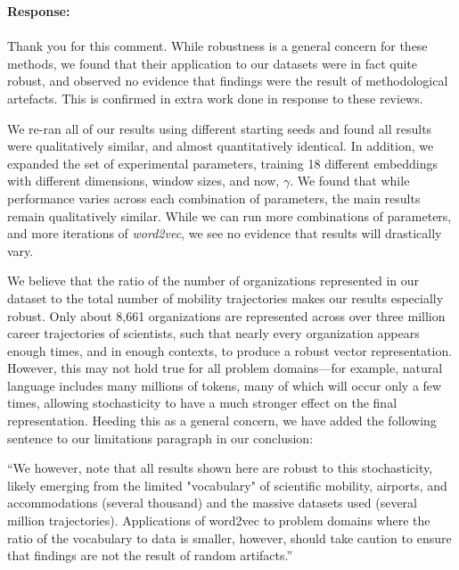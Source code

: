 \documentclass[12pt,a4paper]{article}
\newcommand{\response}[1]{{\noindent \textbf{Response:} \\ \\ \noindent #1}}
\begin{document}
\response{Thank you for this comment. While robustness is a general concern for these methods, we found that their application to our datasets were in fact quite robust, and observed no evidence that findings were the result of methodological artefacts. This is confirmed in extra work done in response to these reviews. 

\noindent We re-ran all of our results using different starting seeds and found all results were qualitatively similar, and almost quantitatively identical. 
In addition, we expanded the set of experimental parameters, training 18 different embeddings with different dimensions, window sizes, and now, $\gamma$. 
We found that while performance varies across each combination of parameters, the main results remain qualitatively similar. 
While we can run more combinations of parameters, and more iterations of \textit{word2vec}, we see no evidence that results will drastically vary. 

\noindent We believe that the ratio of the number of organizations represented in our dataset to the total number of mobility trajectories makes our results especially robust. 
Only about 8,661 organizations are represented across over three million career trajectories of scientists, such that nearly every organization appears enough times, and in enough contexts, to produce a robust vector representation. 
However, this may not hold true for all problem domains—for example, natural language includes many millions of tokens, many of which will occur only a few times, allowing stochasticity to have a much stronger effect on the final representation. 
Heeding this as a general concern, we have added the following sentence to our limitations paragraph in our conclusion: 

\noindent “We however, note that all results shown here are robust to this stochasticity, likely emerging from the limited "vocabulary" of scientific mobility, airports, and accommodations (several thousand) and the massive datasets used (several million trajectories). Applications of word2vec to problem domains where the ratio of the vocabulary to data is smaller, however, should take caution to ensure that findings are not the result of random artifacts.”

}
\end{document}
